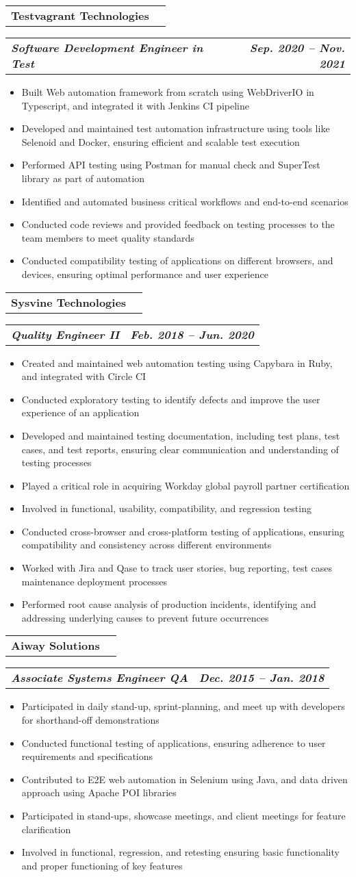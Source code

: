\documentclass[letterpaper,11pt]{article}
\makeatletter
\newcommand{\resumeItem}[1]{
  \item\small{
    {#1 \vspace{-1pt}}
  }
}
\newcommand{\resumeSubheading}[4]{
  \vspace{-1pt}\item
    \begin{tabular*}{\textwidth}[t]{l@{\extracolsep{\fill}}r}
      \textbf{#1} & {\color{dark-grey}\small #2}\vspace{1pt}\\ %
    \end{tabular*}\vspace{-4pt}
}
\newcommand{\resumeSubSubheading}[2]{
    \item
    \begin{tabular*}{\textwidth}{l@{\extracolsep{\fill}}r}
      \textbf{\textit{\small #1}} & \textbf{\textit{\small #2}} \\
    \end{tabular*}\vspace{-7pt}
}
\newcommand{\resumeItemListStart}{\begin{itemize}}
\newcommand{\resumeItemListEnd}{\end{itemize}\vspace{0pt}}
\makeatother
\begin{document}
    \resumeSubheading
      {Testvagrant Technologies}{}
      {}{}
      \resumeSubSubheading
      {Software Development Engineer in Test}{Sep. 2020 -- Nov. 2021}
      \resumeItemListStart
        \resumeItem{Built Web automation framework from scratch using WebDriverIO in Typescript, and integrated it with Jenkins CI pipeline}
        \resumeItem{Developed and maintained test automation infrastructure using tools like Selenoid and Docker, ensuring efficient and scalable test execution}
        \resumeItem{Performed API testing using Postman for manual check and SuperTest library as part of automation}
        \resumeItem{Identified and automated business critical workflows and end-to-end scenarios}
        \resumeItem{Conducted code reviews and provided feedback on testing processes to the team members to meet quality standards}
        \resumeItem{Conducted compatibility testing of applications on different browsers, and devices, ensuring optimal performance and user experience}
    \resumeItemListEnd

    \resumeSubheading
      {Sysvine Technologies}{}
      {}{}
      \resumeSubSubheading
      {Quality Engineer II}{Feb. 2018 -- Jun. 2020}
      \resumeItemListStart
        \resumeItem{Created and maintained web automation testing using Capybara in Ruby, and integrated with Circle CI}
        \resumeItem{Conducted exploratory testing to identify defects and improve the user experience of an application}
        \resumeItem{Developed and maintained testing documentation, including test plans, test cases, and test reports, ensuring clear communication and understanding of testing processes}
        \resumeItem{Played a critical role in acquiring Workday global payroll partner certification}
        \resumeItem{Involved in functional, usability, compatibility, and regression testing}
        \resumeItem{Conducted cross-browser and cross-platform testing of applications, ensuring compatibility and consistency across different environments}
        \resumeItem{Worked with Jira and Qase to track user stories, bug reporting, test cases maintenance deployment processes}
        \resumeItem{Performed root cause analysis of production incidents, identifying and addressing underlying causes to prevent future occurrences}
      \resumeItemListEnd

    \resumeSubheading
      {Aiway Solutions}{}
      {}{}
      \resumeSubSubheading
      {Associate Systems Engineer QA}{Dec. 2015 -- Jan. 2018}
      \resumeItemListStart
        \resumeItem{Participated in daily stand-up, sprint-planning, and meet up with developers for shorthand-off demonstrations}
        \resumeItem{Conducted functional testing of applications, ensuring adherence to user requirements and specifications}
        \resumeItem{Contributed to E2E web automation in Selenium using Java, and data driven approach using Apache POI libraries}
        \resumeItem{Participated in stand-ups, showcase meetings, and client meetings for feature clarification}
        \resumeItem{Involved in functional, regression, and retesting ensuring basic functionality and proper functioning of key features}
      \resumeItemListEnd
\end{document}
